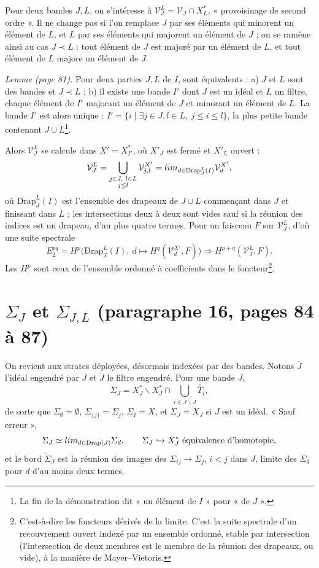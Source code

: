 \documentclass[11pt,a4paper]{article}
\begin{document}
Pour deux bandes $J, L$, on s'intéresse à $\mathcal{V}^L_J = \mathcal{V}_J \cap X^{*}_L$,
« provoisinage de second ordre ». Il ne change pas si l'on remplace $J$ par ses
éléments qui minorent un élément de $L$, et $L$ par ses éléments qui majorent un
élément de $J$ ; on se ramène ainsi au cas $J \prec L$ : tout élément de $J$ est
majoré par un élément de $L$, et tout élément de $L$ majore un élément de $J$.

\emph{Lemme (page 81).} Pour deux parties $J, L$ de $I$, sont équivalents : a) $J$ et
$L$ sont des bandes et $J \prec L$ ; b) il existe une bande $I'$ dont $J$ est un idéal
et $L$ un filtre, chaque élément de $I'$ majorant un élément de $J$ et minorant un
élément de $L$. La bande $I'$ est alors unique : $I' = \{ i \mid \exists j \in J, l \in
L,\ j \leq i \leq l \}$, la plus petite bande contenant $J \cup L$\footnote{La fin de
la démonstration dit « un élément de $I$ » pour « de $J$ ».}.

Alors $\mathcal{V}^L_J$ se calcule dans $X' = X^{*}_{I'}$, où $X'_J$ est fermé et
$X'_L$ ouvert :
\[
\mathcal{V}^L_J = \bigcup_{\substack{j \in J,\ l \in L\\ j \leq l}}
\mathcal{V}^{X'}_{j,l} = \varinjlim_{d \in \mathrm{Drap}^L_J(I)} \mathcal{V}^{X'}_d ,
\]
où $\mathrm{Drap}^L_J(I)$ est l'ensemble des drapeaux de $J \cup L$ commençant dans $J$
et finissant dans $L$ ; les intersections deux à deux sont vides sauf si la réunion
des indices est un drapeau, d'au plus quatre termes. Pour un faisceau $F$ sur
$\mathcal{V}^L_J$, d'où une suite spectrale
\[
E_2^{pq} = H^p\bigl(\mathrm{Drap}^L_J(I),\ d \mapsto H^q(\mathcal{V}^{X'}_d, F)\bigr)
\Longrightarrow H^{p+q}(\mathcal{V}^L_J, F).
\]
Les $H^p$ sont ceux de l'ensemble ordonné à coefficients dans le
foncteur\footnote{C'est-à-dire les foncteurs dérivés de la limite. C'est la suite
spectrale d'un recouvrement ouvert indexé par un ensemble ordonné, stable par
intersection (l'intersection de deux membres est le membre de la réunion des
drapeaux, ou vide), à la manière de Mayer--Vietoris.}.

\section*{$\Sigma_J$ et $\Sigma_{J,L}$ (paragraphe 16, pages 84 à 87)}

On revient aux strates déployées, désormais indexées par des bandes. Notons $\bar
J$ l'idéal engendré par $J$ et $\tilde J$ le filtre engendré. Pour une bande $J$,
\[
\Sigma_J = X^{*}_J \smallsetminus X^{*}_J \cap \bigcup_{i \in \bar J \smallsetminus J}
\overset{\circ}{T}_i ,
\]
de sorte que $\Sigma_\emptyset = \emptyset$, $\Sigma_{\{j\}} = \Sigma_j$, $\Sigma_I =
X$, et $\Sigma_J = X_J$ si $J$ est un idéal. « Sauf erreur »,
\[
\Sigma_J \simeq \varinjlim_{d \in \mathrm{Drap}(J)} \Sigma_d, \qquad \Sigma_J
\hookrightarrow X^{*}_J \ \text{équivalence d'homotopie},
\]
et le bord $\dot \Sigma_J$ est la réunion des images des $\Sigma_{ij} \to \Sigma_j$,
$i<j$ dans $J$, limite des $\Sigma_d$ pour $d$ d'au moins deux termes.
\end{document}
